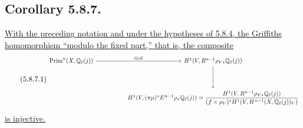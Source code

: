 \subsection*{Corollary 5.8.7.}
\underline{With the preceding notation and under the hypotheses of 5.8.4,
the Griffiths homomorphism ``modulo the fixed part,'' that is, the
composite}
\begin{equation}\tag{5.8.7.1}
\resizebox{\textwidth}{!}{%
\begin{tikzcd}[ampersand replacement=\&,column sep=huge,row sep=huge]
\operatorname{Prim}^n(X,\mathbb Q_\ell(j))
  \arrow[r,"\operatorname{Grif}"]
\& H^1(V,R^{n-1}\rho_{V*}\mathbb Q_\ell(j)) \arrow[d] \\
{}
\& H^1(V,(\pi\mu)^*E^{n-1}\rho_*\mathbb Q_\ell(j))
\simeq
\dfrac{H^1(V,R^{n-1}\rho_{V*}\mathbb Q_\ell(j))}
{(f\times\rho_V)^*H^1(V,H^{n-1}(X,\mathbb Q_\ell(j))_V)}
\end{tikzcd}}
\end{equation}
\underline{is injective.}


